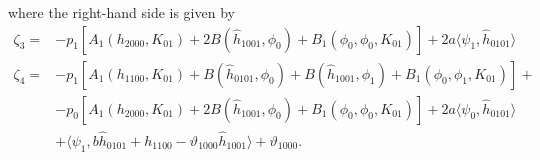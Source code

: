 where the right-hand side is given by
\begin{equation}
    \label{btdde:eq:zeta3_zeta4_tbt}
    \begin{aligned}
        \zeta_3 ={}& -p_1\left[A_1(h_{2000},K_{01}) + 2 B(\hat h_{1001},\phi_0) + B_1(\phi_0,\phi_0,K_{01})\right] + 2a\langle \psi_1, \hat h_{0101} \rangle\\
        \zeta_4 ={}& -p_1\left[A_1(h_{1100},K_{01}) + B(\hat h_{0101},\phi_0) + B(\hat h_{1001},\phi_1) + B_1(\phi_0,\phi_1,K_{01})\right] + \\
                   &- p_0 \left[A_1(h_{2000},K_{01}) + 2 B(\hat h_{1001},\phi_0) + B_1(\phi_0,\phi_0,K_{01})\right] + 2 a \langle \psi_0, \hat h_{0101} \rangle \\
                                & + \langle \psi_1, b \hat h_{0101} + h_{1100} - \vartheta_{1000} \hat h_{1001} \rangle + \vartheta_{1000}. 
    \end{aligned}
\end{equation}

